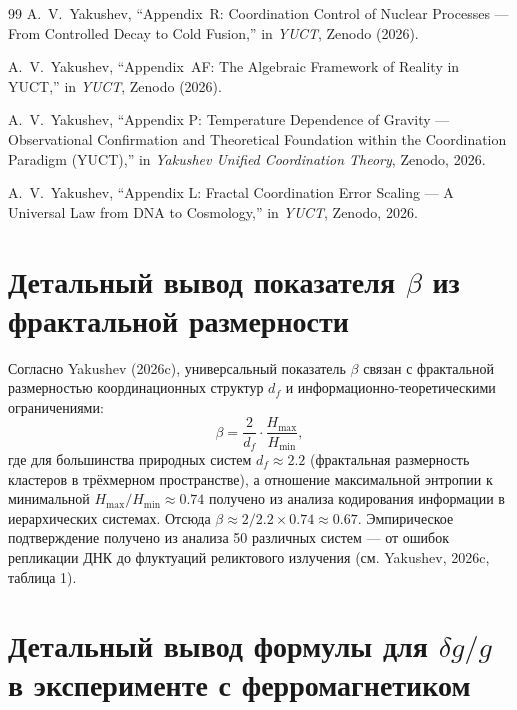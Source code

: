 \documentclass[12pt]{article}
\theoremstyle{remark}
\newcommand{\df}{d_{\!f}}
\begin{document}
\begin{thebibliography}{99}
		A.~V.~Yakushev, ``Appendix~R: Coordination Control of Nuclear Processes ---
		From Controlled Decay to Cold Fusion,''
		in \emph{YUCT}, Zenodo (2026).
		
		A.~V.~Yakushev, ``Appendix~AF: The Algebraic Framework of Reality in YUCT,''
		in \emph{YUCT}, Zenodo (2026).
		
		A.~V.~Yakushev, ``Appendix P: Temperature Dependence of Gravity — Observational Confirmation and Theoretical Foundation within the Coordination Paradigm (YUCT),'' in \emph{Yakushev Unified Coordination Theory}, Zenodo, 2026.
		
		A.~V.~Yakushev, ``Appendix L: Fractal Coordination Error Scaling — A Universal Law from DNA to Cosmology,'' in \emph{YUCT}, Zenodo, 2026.
		
	\end{thebibliography}
	
	\appendix
	
	\section{Детальный вывод показателя $\beta$ из фрактальной размерности}
	\label{app:beta-derivation}
	
	Согласно Yakushev (2026c), универсальный показатель $\beta$ связан с фрактальной размерностью координационных структур $\df$ и информационно-теоретическими ограничениями:
	\begin{equation}
		\beta = \frac{2}{\df} \cdot \frac{H_{\text{max}}}{H_{\text{min}}},
		\label{eq:beta-derivation}
	\end{equation}
	где для большинства природных систем $\df \approx 2.2$ (фрактальная размерность кластеров в трёхмерном пространстве), а отношение максимальной энтропии к минимальной $H_{\text{max}}/H_{\text{min}} \approx 0.74$ получено из анализа кодирования информации в иерархических системах. Отсюда $\beta \approx 2/2.2 \times 0.74 \approx 0.67$. Эмпирическое подтверждение получено из анализа 50 различных систем — от ошибок репликации ДНК до флуктуаций реликтового излучения (см. Yakushev, 2026c, таблица 1).
	
	\section{Детальный вывод формулы для $\delta g/g$ в эксперименте с ферромагнетиком}
	\label{app:delta-g-derivation}
	
\end{document}
